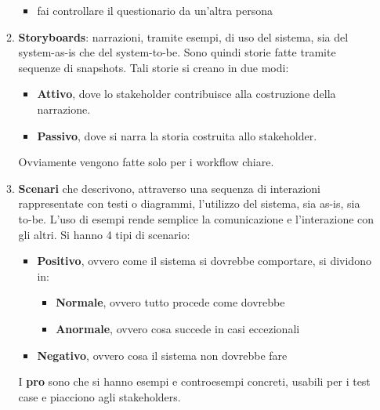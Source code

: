 \begin{itemize}
\begin{enumerate}
\begin{itemize}
                              \item fai controllare il questionario da un'altra persona
                        \end{itemize}
                  \item \textbf{Storyboards}: narrazioni, tramite esempi, di uso del sistema,
                        sia del system-as-is che del system-to-be. Sono quindi storie fatte tramite
                        sequenze di snapshots. Tali storie si creano in due modi:
                        \begin{itemize}
                              \item \textbf{Attivo}, dove lo stakeholder contribuisce alla costruzione
                                    della narrazione.
                              \item \textbf{Passivo}, dove si narra la storia costruita allo
                                    stakeholder.
                        \end{itemize}
                        Ovviamente vengono fatte solo per i workflow chiare.
                  \item \textbf{Scenari} che descrivono, attraverso una sequenza di interazioni
                        rappresentate con testi o diagrammi, l'utilizzo del sistema, sia as-is, sia
                        to-be. L'uso di esempi rende semplice la comunicazione e l'interazione con
                        gli altri. Si hanno 4 tipi di scenario:
                        \begin{itemize}
                              \item \textbf{Positivo}, ovvero come il sistema si dovrebbe comportare,
                                    si dividono in:
                                    \begin{itemize}
                                          \item \textbf{Normale}, ovvero tutto procede come dovrebbe
                                          \item \textbf{Anormale}, ovvero cosa succede in casi eccezionali
                                    \end{itemize}
                              \item \textbf{Negativo}, ovvero cosa il sistema non dovrebbe fare
                        \end{itemize}
                        I \textbf{pro} sono che si hanno esempi e controesempi
                        concreti, usabili per i test case e piacciono agli stakeholders.


\end{enumerate}
\end{itemize}
